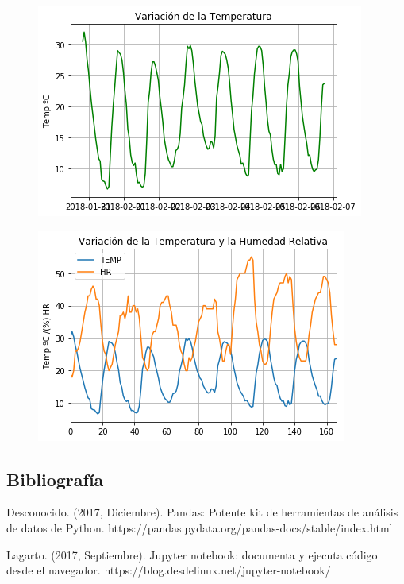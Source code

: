 \documentclass{article}
\begin{document}
 \begin{figure}[ht!]
   \centering
   \includegraphics[width=0.8\linewidth]{Variaciondelatemperatura.png}
  \end{figure}


 \begin{figure}[ht!]
   \centering
   \includegraphics[width=0.8\linewidth]{Variaciondelatemperaturayhumedadrelativa.png}
  \end{figure}


\subsection{Bibliografía}

Desconocido. (2017, Diciembre). Pandas: Potente kit de herramientas de análisis de datos de Python. https://pandas.pydata.org/pandas-docs/stable/index.html

Lagarto. (2017, Septiembre). Jupyter notebook: documenta y ejecuta código desde el navegador. https://blog.desdelinux.net/jupyter-notebook/
\end{document}
